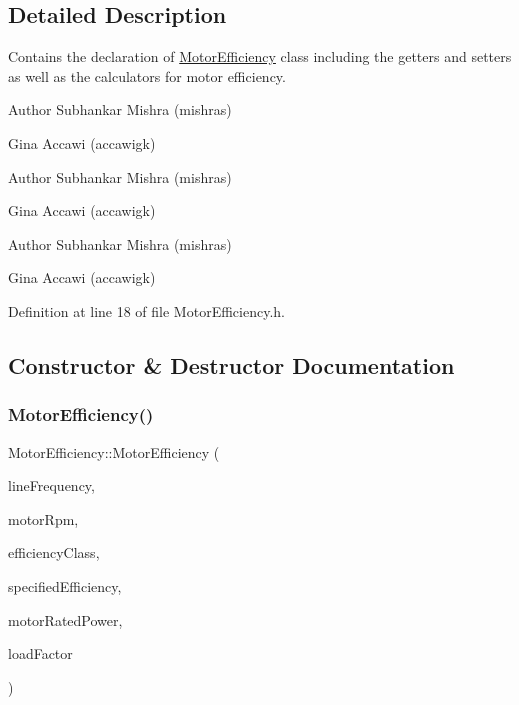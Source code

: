 \subsection{Detailed Description}
Contains the declaration of \hyperlink{class_motor_efficiency}{Motor\+Efficiency} class including the getters and setters as well as the calculators for motor efficiency. 

\begin{DoxyAuthor}{Author}
Subhankar Mishra (mishras) 

Gina Accawi (accawigk) 
\end{DoxyAuthor}


\begin{DoxyAuthor}{Author}
Subhankar Mishra (mishras) 

Gina Accawi (accawigk) 
\end{DoxyAuthor}


\begin{DoxyAuthor}{Author}
Subhankar Mishra (mishras) 

Gina Accawi (accawigk) 
\end{DoxyAuthor}


Definition at line 18 of file Motor\+Efficiency.\+h.



\subsection{Constructor \& Destructor Documentation}
\mbox{\label{class_motor_efficiency_ab8d410693e778a2cb2d5a112cc1a4202}} 
\subsubsection{\texorpdfstring{Motor\+Efficiency()}{MotorEfficiency()}\hspace{0.1cm}{\footnotesize\ttfamily [1/3]}}
{\footnotesize\ttfamily Motor\+Efficiency\+::\+Motor\+Efficiency (\begin{DoxyParamCaption}\item[{\hyperlink{class_motor_acee1bdf1b684ad36cb80dc2829d9fcee}{Motor\+::\+Line\+Frequency}}]{line\+Frequency,  }\item[{double}]{motor\+Rpm,  }\item[{\hyperlink{class_motor_afa022971ae062406a9f588c601673d4e}{Motor\+::\+Efficiency\+Class}}]{efficiency\+Class,  }\item[{double}]{specified\+Efficiency,  }\item[{double}]{motor\+Rated\+Power,  }\item[{double}]{load\+Factor }\end{DoxyParamCaption})\hspace{0.3cm}{\ttfamily [inline]}}

